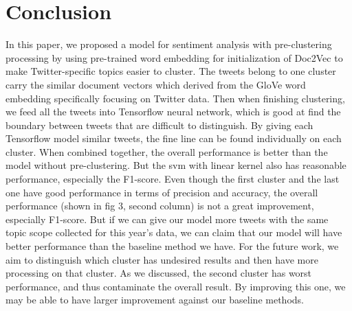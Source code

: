 \documentclass[conference]{IEEEtran}
\begin{document}
\section{Conclusion}
In this paper, we proposed a model for sentiment analysis with pre-clustering processing by using pre-trained word embedding for initialization of Doc2Vec to make Twitter-specific topics easier to cluster. The tweets belong to one cluster carry the similar document vectors which derived from the GloVe word embedding specifically focusing on Twitter data. Then when finishing clustering, we feed all the tweets into Tensorflow neural network, which is good at find the boundary between tweets that are difficult to distinguish. By giving each Tensorflow model similar tweets, the fine line can be found individually on each cluster. When combined together, the overall performance is better than the model without pre-clustering. But the svm with linear kernel also has reasonable performance, especially the F1-score. Even though the first cluster and the last one have good performance in terms of precision and accuracy, the overall performance (shown in fig 3, second column) is not a great improvement, especially F1-score. But if we can give our model more tweets with the same topic scope collected for this year's data, we can claim that our model will have better performance than the baseline method we have. For the future work, we aim to distinguish which cluster has undesired results and then have more processing on that cluster. As we discussed, the second cluster has worst performance, and thus contaminate the overall result. By improving this one, we may be able to have larger improvement against our baseline methods.





%
\end{document}
